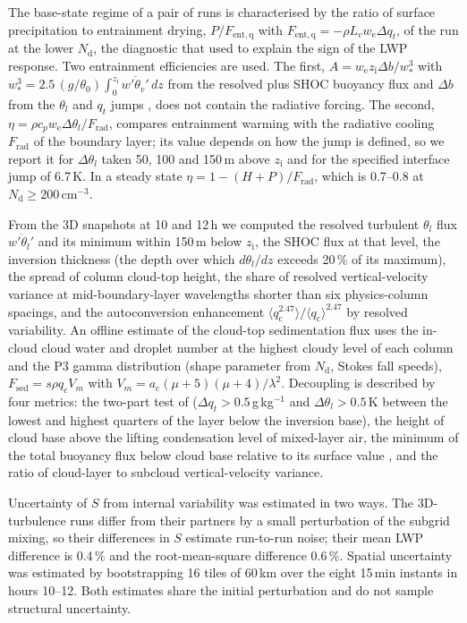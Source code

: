 \documentclass[acp, manuscript]{copernicus}
\newcommand{\Nd}{N_\mathrm{d}}
\newcommand{\we}{w_\mathrm{e}}
\newcommand{\zi}{z_\mathrm{i}}
\newcommand{\cmthree}{\mathrm{cm^{-3}}}
\begin{document}
The base-state regime of a pair of runs is characterised by the ratio of surface precipitation to entrainment drying, $P/F_\mathrm{ent,q}$ with $F_\mathrm{ent,q}=-\rho L_v\we\Delta q_t$, of the run at the lower $\Nd$, the diagnostic that \citet{ackerman2004} used to explain the sign of the LWP response. Two entrainment efficiencies are used. The first, $A=\we\zi\Delta b/w_*^3$ with $w_*^3=2.5\,(g/\theta_0)\int_0^{\zi}\overline{w'\theta_v'}\,dz$ from the resolved plus SHOC buoyancy flux and $\Delta b$ from the $\theta_l$ and $q_t$ jumps \citep{stevens2002}, does not contain the radiative forcing. The second, $\eta=\rho c_p\we\Delta\theta_l/F_\mathrm{rad}$, compares entrainment warming with the radiative cooling $F_\mathrm{rad}$ of the boundary layer; its value depends on how the jump is defined, so we report it for $\Delta\theta_l$ taken 50, 100 and 150\,m above $\zi$ and for the specified interface jump of 6.7\,K. In a steady state $\eta=1-(H+P)/F_\mathrm{rad}$, which is 0.7--0.8 at $\Nd\geq200\,\cmthree$.

From the 3D snapshots at 10 and 12\,h we computed the resolved turbulent $\theta_l$ flux $\overline{w'\theta_l'}$ and its minimum within 150\,m below $\zi$, the SHOC flux at that level, the inversion thickness (the depth over which $d\theta_l/dz$ exceeds 20\,\% of its maximum), the spread of column cloud-top height, the share of resolved vertical-velocity variance at mid-boundary-layer wavelengths shorter than six physics-column spacings, and the autoconversion enhancement $\langle q_\mathrm{c}^{2.47}\rangle/\langle q_\mathrm{c}\rangle^{2.47}$ by resolved variability. An offline estimate of the cloud-top sedimentation flux uses the in-cloud cloud water and droplet number at the highest cloudy level of each column and the P3 gamma distribution (shape parameter from $\Nd$, Stokes fall speeds), $F_\mathrm{sed}=s\rho q_\mathrm{c}V_m$ with $V_m=a_\mathrm{c}(\mu+5)(\mu+4)/\lambda^2$. Decoupling is described by four metrics: the two-part test of \citet{jones2011} ($\Delta q_t>0.5$\,g\,kg$^{-1}$ and $\Delta\theta_l>0.5$\,K between the lowest and highest quarters of the layer below the inversion base), the height of cloud base above the lifting condensation level of mixed-layer air, the minimum of the total buoyancy flux below cloud base relative to its surface value \citep{turton1987,bretherton1997}, and the ratio of cloud-layer to subcloud vertical-velocity variance.

Uncertainty of $S$ from internal variability was estimated in two ways. The 3D-turbulence runs differ from their partners by a small perturbation of the subgrid mixing, so their differences in $S$ estimate run-to-run noise; their mean LWP difference is 0.4\,\% and the root-mean-square difference 0.6\,\%. Spatial uncertainty was estimated by bootstrapping 16 tiles of 60\,km over the eight 15\,min instants in hours 10--12. Both estimates share the initial perturbation and do not sample structural uncertainty.
\end{document}
